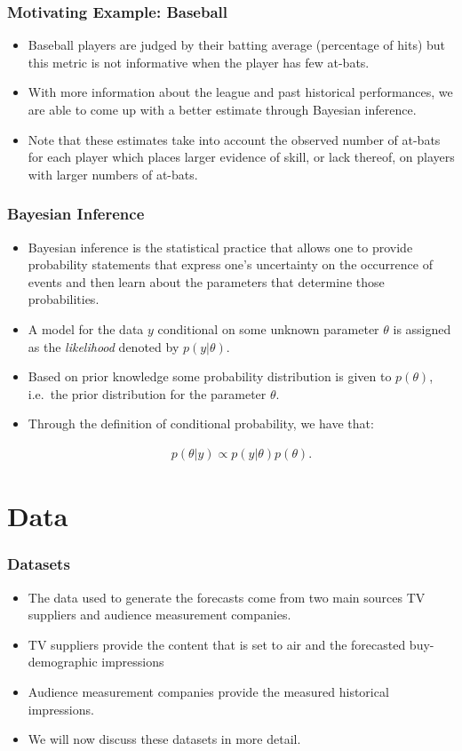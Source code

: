 \documentclass{beamer}
\begin{document}
\begin{frame}
\frametitle{Motivating Example: Baseball}
\begin{itemize}
  \item Baseball players are judged by their batting average (percentage of hits) but this metric is not informative when
  the player has few at-bats.
  \pause
  \item With more information about the league and past historical performances,
  we are able to come up with a better estimate through Bayesian inference.
  \pause
  \item
    Note that these estimates
  take into account the observed number of at-bats for each player
  which places larger evidence of skill, or lack thereof, on players with larger numbers of at-bats.
\end{itemize}
\end{frame}


\begin{frame}
\frametitle{Bayesian Inference}

\begin{itemize}
  \item Bayesian inference is the statistical practice that allows one to provide probability statements
    that express one's uncertainty on the occurrence of events and then learn about the parameters that determine those probabilities.

  \pause
\item A model for the data $y$ conditional on some unknown parameter $\theta$ is assigned
  as the \emph{likelihood} denoted by $p(y | \theta)$.
\pause
\item Based on prior knowledge some probability distribution is given to $p(\theta)$, i.e.\ the prior distribution for the parameter $\theta$.
\pause
\item Through the definition of conditional probability, we have that:

    \begin{align}\label{form:bayes}
      p(\theta | y) \propto p(y | \theta) p(\theta).
    \end{align}
\end{itemize}
\end{frame}


\section{Data}

\begin{frame}
\frametitle{Datasets}
\begin{itemize}
\item
  The data used to generate the forecasts come from two main sources TV suppliers and audience measurement companies.
\pause
\item TV suppliers provide the content that is set to air and the forecasted buy-demographic impressions
\pause
\item Audience measurement companies provide the measured historical impressions.
\pause
\item We will now discuss these datasets in more detail.
\end{itemize}
\end{frame}
\end{document}
